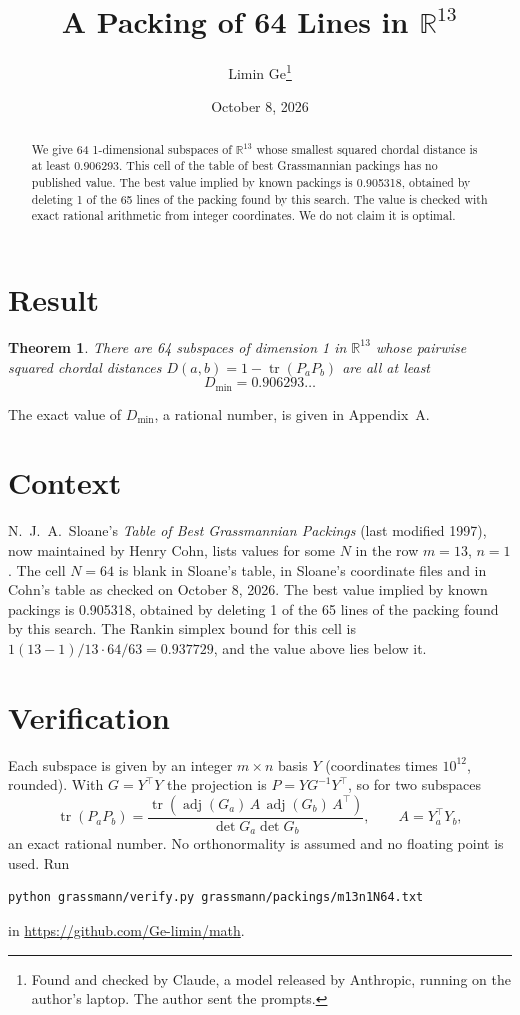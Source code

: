 \documentclass[11pt,a4paper]{article}
\title{A Packing of 64 Lines in $\mathbb{R}^{13}$}
\author{Limin Ge\thanks{Found and checked by Claude, a model released by Anthropic, running on the author's laptop. The author sent the prompts.}}
\date{October 8, 2026}
\newtheorem*{theorem}{Theorem}
\begin{document}
\maketitle
\begin{abstract}
We give 64 1-dimensional subspaces of $\mathbb{R}^{13}$ whose smallest squared chordal distance is at least 0.906293. This cell of the table of best Grassmannian packings has no published value. The best value implied by known packings is 0.905318, obtained by deleting 1 of the 65 lines of the packing found by this search. The value is checked with exact rational arithmetic from integer coordinates. We do not claim it is optimal.
\end{abstract}

\section{Result}
\begin{theorem}
There are 64 subspaces of dimension 1 in $\mathbb{R}^{13}$ whose pairwise squared chordal distances $D(a,b) = 1 - \operatorname{tr}(P_aP_b)$ are all at least
\[ D_{\min} = 0.906293\ldots \]
\end{theorem}
The exact value of $D_{\min}$, a rational number, is given in Appendix~A.


\section{Context}
N.~J.~A.~Sloane's \emph{Table of Best Grassmannian Packings} (last modified 1997), now maintained by Henry Cohn, lists values for some $N$ in the row $m=13$, $n=1$. The cell $N=64$ is blank in Sloane's table, in Sloane's coordinate files and in Cohn's table as checked on October 8, 2026. The best value implied by known packings is 0.905318, obtained by deleting 1 of the 65 lines of the packing found by this search. The Rankin simplex bound for this cell is $1(13-1)/13\cdot 64/63 = 0.937729$, and the value above lies below it.


\section{Verification}
Each subspace is given by an integer $m\times n$ basis $Y$ (coordinates times $10^{12}$, rounded). With $G=Y^\top Y$ the projection is $P=YG^{-1}Y^\top$, so for two subspaces
\[ \operatorname{tr}(P_aP_b)=\frac{\operatorname{tr}(\operatorname{adj}(G_a)\,A\,\operatorname{adj}(G_b)\,A^\top)}{\det G_a\det G_b},\qquad A=Y_a^\top Y_b, \]
an exact rational number. No orthonormality is assumed and no floating point is used. Run
\begin{verbatim}
python grassmann/verify.py grassmann/packings/m13n1N64.txt
\end{verbatim}
in \url{https://github.com/Ge-limin/math}.
\end{document}
